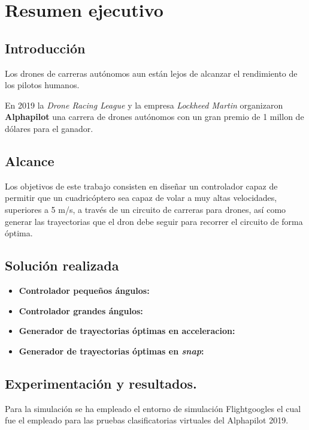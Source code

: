 \chapter*{Resumen ejecutivo}
\section*{Introducción}

Los drones de carreras autónomos aun están lejos de alcanzar el rendimiento de los pilotos humanos. 

En 2019 la \textit{Drone Racing League} y la empresa \textit{Lockheed Martin} organizaron \textbf{Alphapilot} una carrera de drones autónomos con un gran premio de 1 millon de dólares para el ganador.

\section*{Alcance}

Los objetivos de este trabajo consisten en diseñar un controlador capaz de permitir que un cuadricóptero sea capaz de volar a muy altas velocidades, superiores a 5 m/s, a través de un circuito de carreras para drones, así como generar las trayectorias que el dron debe seguir para recorrer el circuito de forma óptima.

\section*{Solución realizada}

\begin{itemize}
	\item \textbf{Controlador pequeños ángulos:}
	\item \textbf{Controlador grandes ángulos:}
	\item \textbf{Generador de trayectorias óptimas en acceleracion:}
	\item \textbf{Generador de trayectorias óptimas en \textit{snap}:}
\end{itemize}

\section*{Experimentación y resultados.}

Para la simulación se ha empleado el entorno de simulación Flightgoogles   el cual fue el empleado para las pruebas clasificatorias virtuales del Alphapilot 2019.



